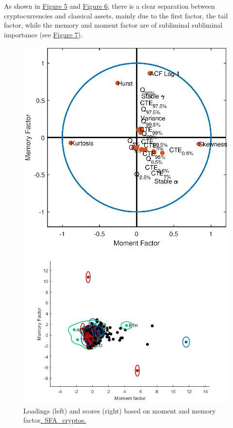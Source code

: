 As shown in \hyperref[fig:figure_5]{Figure 5} and \hyperref[fig:figure_6]{Figure 6}, there is a clear separation between cryptocurrencies and classical assets, mainly due to the first factor, the tail factor, while the memory and moment factor are of subliminal subliminal importance (see \hyperref[fig:figure_7]{Figure 7}).
\begin{figure}[H]
	\begin{minipage}[b]{0.55\textwidth}
		\centering
		\includegraphics[width=1\textwidth]{Fig/figure_7a}
		
		
	\end{minipage}
	\begin{minipage}[b]{0.55\textwidth}
		\centering
		\includegraphics[width=1\textwidth]{Fig/figure_7b}
		
	\end{minipage}
	\caption {Loadings (left) and scores (right) based on moment and memory factor\href{https://github.com/QuantLet/Genus_proximum_cryptos/tree/master/SFA_Cryptos}{. SFA\_cryptos.}}
	\label{fig:figure_7}
\end{figure}

